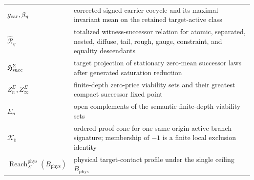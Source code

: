\documentclass[11pt]{article}
\numberwithin{section}{part}
\theoremstyle{plain}
\theoremstyle{definition}
\theoremstyle{remark}
\newcommand{\Reach}{\operatorname{Reach}}
\newcommand{\Phys}{\mathrm{phys}}
\newcommand{\Budget}{B_{\Phys}}
\begin{document}
\begin{longtable}{p{.22\linewidth}p{.68\linewidth}}
\(g_{\rm car},\beta_\eta\) & corrected signed carrier cocycle and its maximal
invariant mean on the retained target-active class\\
\(\widehat{\mathcal R}_\eta\) & totalized witness-successor relation for
atomic, separated, nested, diffuse, tail, rough, gauge, constraint, and
equality descendants\\
\(\mathfrak H_{\rm succ}^{\Sigma}\) & target projection of stationary
zero-mean successor laws after generated saturation reduction\\
\(Z_n^\Sigma,Z_\infty^\Sigma\) & finite-depth zero-price viability sets and
their greatest compact successor fixed point\\
\(E_n\) & open complements of the semantic finite-depth viability sets\\
\(\mathcal K_{\mathfrak b}\) & ordered proof cone for one same-origin active
branch signature; membership of \(-1\) is a finite local exclusion identity\\
\(\Reach^{\Phys}_\Sigma(\Budget)\) & physical target-contact profile under
the single ceiling \(\Budget\)\\
\bottomrule
\end{longtable}



\end{document}
